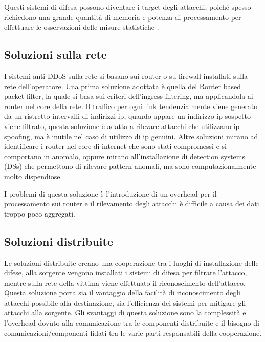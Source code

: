 
Questi sistemi di difesa possono diventare i target degli attacchi, poiché spesso richiedono una grande quantità di memoria e potenza di processamento per effettuare le osservazioni delle misure statistiche \cite{ddos_survey_4}.

\subsection{Soluzioni sulla rete}

I sistemi anti-DDoS sulla rete si basano sui router o su firewall installati sulla rete dell'operatore.
Una prima soluzione adottata è quella del Router based packet filter, la quale si basa sui criteri dell'ingress filtering, ma applicandola ai router nel core della rete. Il traffico per ogni link tendenzialmente viene generato da un ristretto intervalli di indirizzi ip, quando appare un indirizzo ip sospetto viene filtrato, questa soluzione è adatta a rilevare attacchi che utilizzano ip spoofing, ma è inutile nel caso di utilizzo di ip genuini.
Altre soluzioni mirano ad identificare i router nel core di internet che sono stati compromessi e si comportano in anomalo, oppure mirano all'installazione di detection systems (DSs) che permettono di rilevare pattern anomali, ma sono computazionalmente molto dispendiose.

I problemi di questa soluzione è l'introduzione di un overhead per il processamento sui router e il rilevamento degli attacchi è difficile a causa dei dati troppo poco aggregati.

\subsection{Soluzioni distribuite}

Le soluzioni distribuite creano una cooperazione tra i luoghi di installazione delle difese, alla sorgente vengono installati i sistemi di difesa per filtrare l'attacco, mentre sulla rete della vittima viene effettuato il riconoscimento dell'attacco. Questa soluzione porta sia il vantaggio della facilità di riconoscimento degli attacchi possibile alla destinazione, sia l'efficienza dei sistemi per mitigare gli attacchi alla sorgente.
Gli svantaggi di questa soluzione sono la complessità e l'overhead dovuto alla comunicazione tra le componenti distribuite e il bisogno di comunicazioni/componenti fidati tra le varie parti responsabili della cooperazione.

